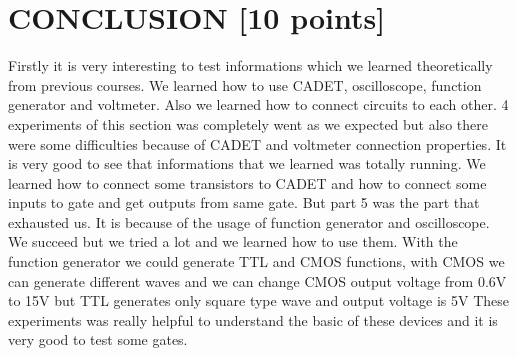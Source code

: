 \documentclass[pdftex,12pt,a4paper]{article}
\begin{document}
\section{CONCLUSION [10 points]}
Firstly it is very interesting to test informations which we learned theoretically from previous courses. We learned how to use CADET, oscilloscope, function generator and voltmeter. Also we learned how to connect circuits to each other. 4 experiments of this section was completely went as we expected but also there were some difficulties because of CADET and voltmeter connection properties. It is very good to  see that informations that we learned was totally running. We learned how to connect some transistors to CADET and how to connect some inputs to gate and get outputs from same gate. But part 5 was the part that exhausted us. It is because of the usage of function generator and oscilloscope. We succeed but we tried a lot and we learned how to use them. With the function generator we could generate TTL and CMOS functions, with CMOS we can generate different waves and we can change CMOS output voltage from 0.6V to 15V but TTL generates only square type wave and output voltage is 5V These experiments was really helpful to understand the basic of these devices and it is very good to test some gates. 


\newpage
{}

\nocite{overleaf}



\end{document}
